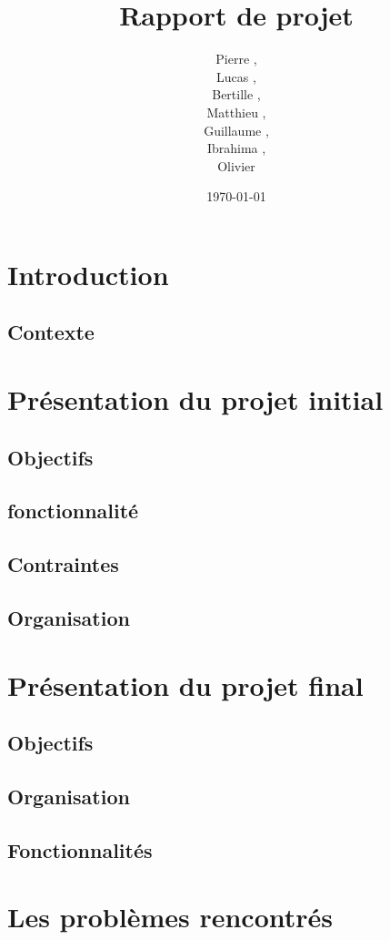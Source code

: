 \documentclass{../res/univ-projet}
\title{Rapport de projet}
\author{Pierre \bsc{Balmelle},\\ Lucas \bsc{Barbay},\\ Bertille \bsc{Bouillie},\\ Matthieu \bsc{Fin},\\ Guillaume \bsc{Leroy},\\ Ibrahima \bsc{Sorry Barry},\\ Olivier \bsc{Thibault}}
\date{\today}
\begin{document}
\maketitle
\newpage
\tableofcontents

\newpage

\section{Introduction}
  \subsection{Contexte}

\section{Présentation du projet initial}
  \subsection{Objectifs}
  \subsection{fonctionnalité}
  \subsection{Contraintes}
  \subsection{Organisation}

\section{Présentation du projet final}
  \subsection{Objectifs}
  \subsection{Organisation}
  \subsection{Fonctionnalités}


\section{Les problèmes rencontrés}
\end{document}
